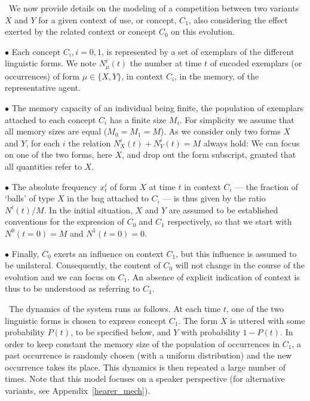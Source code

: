 \documentclass[12pt,twocolumn,amsmath,amssymb,aps,longbibliography]{revtex4-1}  %
\begin{document}
\ We now provide details on the modeling of a competition between two variants $X$ and $Y$ for a given context of use, or concept, $C_1$, also considering the effect exerted by the related context or concept $C_0$ on this evolution. 

$\bullet$ Each concept $C_i, i=0,1$, is represented by a set of exemplars of the different linguistic forms. We note $N_{\mu}^i(t)$ the number at time $t$ of encoded exemplars (or occurrences) of form $\mu \in \{X, Y\}$, in context $C_i$, in the memory, of the representative agent. 

$\bullet$ The memory capacity of an individual being finite, the population of exemplars attached to each concept $C_i$ has a finite size $M_i$. For simplicity we assume that all memory sizes are equal ($M_0 = M_1 = M$). As we consider only two forms $X$ and $Y$, for each $i$ the relation $N_{X}^i(t) + N_{Y}^i(t) = M$  always hold: We can focus on one of the two forms, here $X$, and drop out the form subscript, granted that all quantities refer to $X$.

$\bullet$ The absolute frequency $x^i_t$ of form $X$ at time $t$ in context $C_i$ --- the fraction of `balls' of type $X$ in the bag attached to $C_i$ --- is thus given by the ratio $N^i(t)/ M$. In the initial situation, $X$ and $Y$  are assumed to be established conventions for the expression of $C_0$ and $C_1$ respectively, so that we start with $N^0(t = 0) = M$ and $N^1(t = 0) = 0$.

$\bullet$ Finally, $C_0$ exerts an influence on context $C_1$, but this influence is assumed to be unilateral. Consequently, the content of $C_0$ will not change in the course of the evolution and we can focus on $C_1$. An absence of explicit indication of context is thus to be understood as referring to $C_1$. 

\ The dynamics of the system runs as follows. At each time $t$, one of the two linguistic forms is chosen to express concept $C_1$. The form $X$ is uttered with some probability $P(t)$, to be specified below, and $Y$ with probability $1-P(t)$. In order to keep constant the memory size of the population of occurrences in $C_1$,  a past occurrence is randomly chosen (with a uniform distribution) and the new occurrence takes its place. This dynamics is then repeated a large number of times. Note that this model focuses on a speaker perspective (for alternative variants, see Appendix~\ref{hearer_mech}). 
\end{document}
